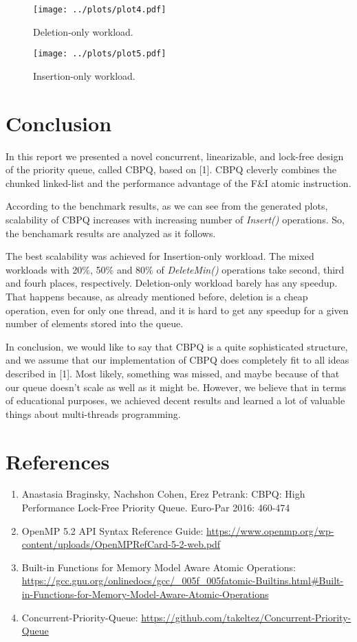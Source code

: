 \documentclass{article}
\begin{document}
\begin{figure}[H]
  \centering
  \texttt{[image: ../plots/plot4.pdf]}
  \caption{Deletion-only workload.}
  \label{fig:plot4}
\end{figure}

\begin{figure}[H]
  \centering
  \texttt{[image: ../plots/plot5.pdf]}
  \caption{Insertion-only workload.}
  \label{fig:plot5}
\end{figure}

\section{Conclusion}
In this report we presented a novel concurrent, linearizable, and lock-free design of the priority queue, called CBPQ, based on [1]. CBPQ cleverly combines the chunked linked-list and the performance advantage of the F\&I atomic instruction.\par
According to the benchmark results, as we can see from the generated plots, scalability of CBPQ increases with increasing number of \textit{Insert()} operations. So, the benchamark results are analyzed as it follows.\par

The best scalability was achieved for Insertion-only workload. The mixed workloads with 20\%, 50\% and 80\% of \textit{DeleteMin()} operations take second, third and fourh places, respectively. Deletion-only workload barely has any speedup. That happens because, as already mentioned before, deletion is a cheap operation, even for only one thread, and it is hard to get any speedup for a given number of elements stored into the queue.\par

In conclusion, we would like to say that CBPQ is a quite sophisticated structure, and we assume that our implementation of CBPQ does completely fit to all ideas described in [1]. Most likely, something was missed, and maybe because of that our queue doesn't scale as well as it might be. However, we believe that in terms of educational purposes, we achieved decent results and learned a lot of valuable things about multi-threads programming.

\pagebreak
\section*{References}
\begin{enumerate}
\item{Anastasia Braginsky, Nachshon Cohen, Erez Petrank: CBPQ: High Performance Lock-Free Priority Queue. Euro-Par 2016: 460-474}
\item{OpenMP 5.2 API Syntax Reference Guide: \url{https://www.openmp.org/wp-content/uploads/OpenMPRefCard-5-2-web.pdf}}
\item{Built-in Functions for Memory Model Aware Atomic Operations: \url{https://gcc.gnu.org/onlinedocs/gcc/_005f_005fatomic-Builtins.html#Built-in-Functions-for-Memory-Model-Aware-Atomic-Operations}}
\item{Concurrent-Priority-Queue: \url{https://github.com/takeltez/Concurrent-Priority-Queue}}
\end{enumerate}
\end{document}

